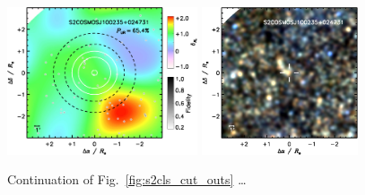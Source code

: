 \documentclass[a4paper, fleqn, usenatbib]{mnras}
\begin{document}
\begin{figure}
    \includegraphics[width=0.5\textwidth]{S2COSMOSJ100235+024731-overdensity}
    \includegraphics[width=0.41\textwidth]{S2COSMOSJ100235+024731-spire-rgb}
    \caption{Continuation of Fig.~\ref{fig:s2cls_cut_outs} \ldots}
    \label{fig:this_figure}
\end{figure}
\end{document}
